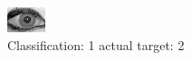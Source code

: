 \begin{figure}[h!]
\begin{center}
\includegraphics[width=0.60\columnwidth]{figures/ID2020_class_1_target_2.png}
\end{center}
\caption{ Classification: 1 actual target: 2}
\label{fig:ID2020_class_1_target_2}
\end{figure}
